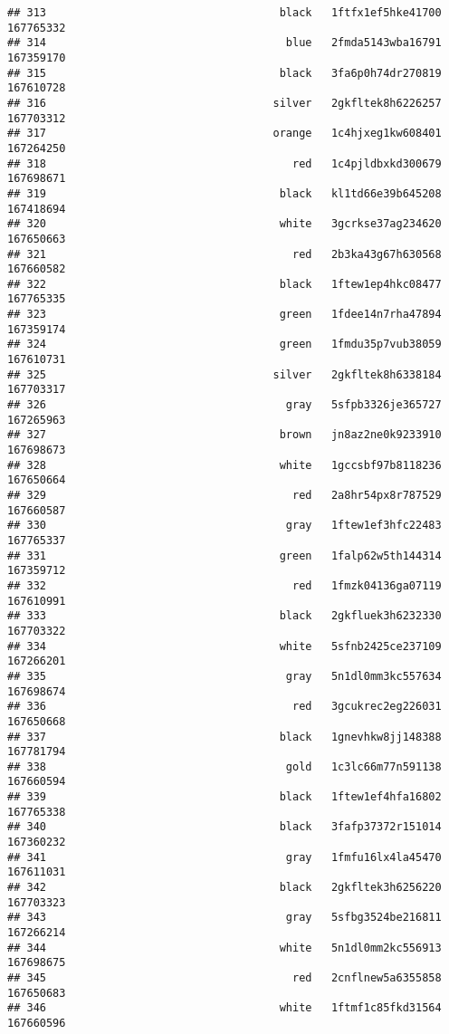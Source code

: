 \documentclass[
]{article}
\begin{document}
\begin{verbatim}
## 313                                    black   1ftfx1ef5hke41700 167765332
## 314                                     blue   2fmda5143wba16791 167359170
## 315                                    black   3fa6p0h74dr270819 167610728
## 316                                   silver   2gkfltek8h6226257 167703312
## 317                                   orange   1c4hjxeg1kw608401 167264250
## 318                                      red   1c4pjldbxkd300679 167698671
## 319                                    black   kl1td66e39b645208 167418694
## 320                                    white   3gcrkse37ag234620 167650663
## 321                                      red   2b3ka43g67h630568 167660582
## 322                                    black   1ftew1ep4hkc08477 167765335
## 323                                    green   1fdee14n7rha47894 167359174
## 324                                    green   1fmdu35p7vub38059 167610731
## 325                                   silver   2gkfltek8h6338184 167703317
## 326                                     gray   5sfpb3326je365727 167265963
## 327                                    brown   jn8az2ne0k9233910 167698673
## 328                                    white   1gccsbf97b8118236 167650664
## 329                                      red   2a8hr54px8r787529 167660587
## 330                                     gray   1ftew1ef3hfc22483 167765337
## 331                                    green   1falp62w5th144314 167359712
## 332                                      red   1fmzk04136ga07119 167610991
## 333                                    black   2gkfluek3h6232330 167703322
## 334                                    white   5sfnb2425ce237109 167266201
## 335                                     gray   5n1dl0mm3kc557634 167698674
## 336                                      red   3gcukrec2eg226031 167650668
## 337                                    black   1gnevhkw8jj148388 167781794
## 338                                     gold   1c3lc66m77n591138 167660594
## 339                                    black   1ftew1ef4hfa16802 167765338
## 340                                    black   3fafp37372r151014 167360232
## 341                                     gray   1fmfu16lx4la45470 167611031
## 342                                    black   2gkfltek3h6256220 167703323
## 343                                     gray   5sfbg3524be216811 167266214
## 344                                    white   5n1dl0mm2kc556913 167698675
## 345                                      red   2cnflnew5a6355858 167650683
## 346                                    white   1ftmf1c85fkd31564 167660596

\end{verbatim}
\end{document}

